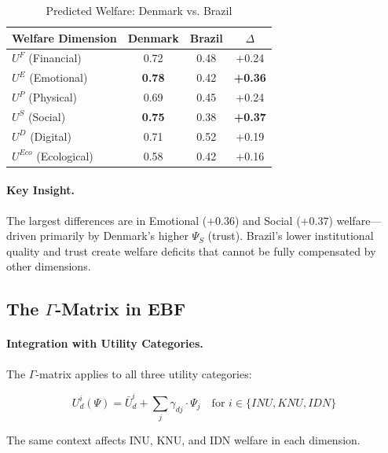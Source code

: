 \begin{table}[htbp]
\centering
\caption{Predicted Welfare: Denmark vs. Brazil}
\label{tab:app-c-denmark-brazil-welfare}
\renewcommand{\arraystretch}{1.3}
\begin{tabular}{@{}lccc@{}}
\toprule
\textbf{Welfare Dimension} & \textbf{Denmark} & \textbf{Brazil} & \textbf{$\Delta$} \\
\midrule
$U^F$ (Financial) & 0.72 & 0.48 & +0.24 \\
$U^E$ (Emotional) & \textbf{0.78} & 0.42 & \textbf{+0.36} \\
$U^P$ (Physical) & 0.69 & 0.45 & +0.24 \\
$U^S$ (Social) & \textbf{0.75} & 0.38 & \textbf{+0.37} \\
$U^D$ (Digital) & 0.71 & 0.52 & +0.19 \\
$U^{Eco}$ (Ecological) & 0.58 & 0.42 & +0.16 \\
\bottomrule
\end{tabular}
\end{table}

\paragraph{Key Insight.}
The largest differences are in Emotional ($+0.36$) and Social ($+0.37$) welfare---driven 
primarily by Denmark's higher $\Psi_S$ (trust). Brazil's lower institutional quality 
and trust create welfare deficits that cannot be fully compensated by other dimensions.

\subsection{The $\Gamma$-Matrix in EBF}

\paragraph{Integration with Utility Categories.}
The $\Gamma$-matrix applies to all three utility categories:

\begin{equation}
U^i_d(\Psi) = \bar{U}^i_d + \sum_{j} \gamma_{dj} \cdot \Psi_j \quad \text{for } i \in \{INU, KNU, IDN\}
\end{equation}

The same context affects INU, KNU, and IDN welfare in each dimension.

